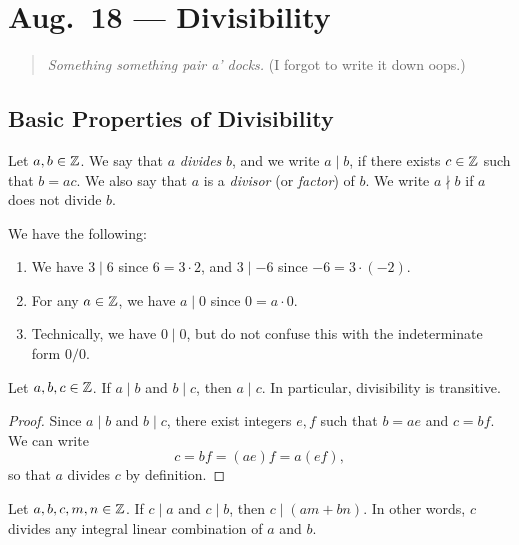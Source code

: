 \chapter{Aug.~18 --- Divisibility}

\begin{quote}
  \emph{Something something pair a' docks.} (I forgot to write it down oops.)
\end{quote}

\section{Basic Properties of Divisibility}

\begin{definition}
  Let $a, b \in \mathbb{Z}$. We say that
  $a$ \emph{divides} $b$, and we write
  $a \mid b$, if there exists $c \in \mathbb{Z}$
  such that $b = ac$. We also say that
  $a$ is a \emph{divisor} (or \emph{factor})
  of $b$. We write
  $a \nmid b$ if $a$ does not divide $b$.
\end{definition}

\begin{example} We have the following:
  \begin{enumerate}
    \item We have $3 \mid 6$ since
      $6 = 3 \cdot 2$, and $3 \mid -6$ since
      $-6 = 3 \cdot (-2)$.
    \item For any $a \in \mathbb{Z}$, we have $a \mid 0$
      since $0 = a \cdot 0$.
    \item Technically, we have
      $0 \mid 0$, but do not confuse this
      with the indeterminate form $0 / 0$.
  \end{enumerate}
\end{example}

\begin{prop}
  Let $a, b, c \in \mathbb{Z}$. If $a \mid b$ and
  $b \mid c$, then $a \mid c$. In particular,
  divisibility is transitive.
\end{prop}

\begin{proof}
  Since $a \mid b$ and $b \mid c$, there
  exist integers $e, f$ such that
  $b = ae$ and $c = bf$. We can write
  \[
    c = bf = (ae)f = a(ef),
  \]
  so that $a$ divides $c$ by definition.
\end{proof}

\begin{prop}
  Let $a, b, c, m, n \in \mathbb{Z}$. If $c \mid a$
  and $c \mid b$, then $c \mid (am + bn)$. In
  other words, $c$ divides any integral
  linear combination of $a$ and $b$.
\end{prop}

